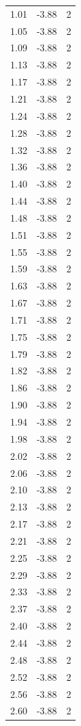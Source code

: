 \begin{longtable}{lrr}
  1.01 & -3.88 & 2 \\
  1.05 & -3.88 & 2 \\
  1.09 & -3.88 & 2 \\
  1.13 & -3.88 & 2 \\
  1.17 & -3.88 & 2 \\
  1.21 & -3.88 & 2 \\
  1.24 & -3.88 & 2 \\
  1.28 & -3.88 & 2 \\
  1.32 & -3.88 & 2 \\
  1.36 & -3.88 & 2 \\
  1.40 & -3.88 & 2 \\
  1.44 & -3.88 & 2 \\
  1.48 & -3.88 & 2 \\
  1.51 & -3.88 & 2 \\
  1.55 & -3.88 & 2 \\
  1.59 & -3.88 & 2 \\
  1.63 & -3.88 & 2 \\
  1.67 & -3.88 & 2 \\
  1.71 & -3.88 & 2 \\
  1.75 & -3.88 & 2 \\
  1.79 & -3.88 & 2 \\
  1.82 & -3.88 & 2 \\
  1.86 & -3.88 & 2 \\
  1.90 & -3.88 & 2 \\
  1.94 & -3.88 & 2 \\
  1.98 & -3.88 & 2 \\
  2.02 & -3.88 & 2 \\
  2.06 & -3.88 & 2 \\
  2.10 & -3.88 & 2 \\
  2.13 & -3.88 & 2 \\
  2.17 & -3.88 & 2 \\
  2.21 & -3.88 & 2 \\
  2.25 & -3.88 & 2 \\
  2.29 & -3.88 & 2 \\
  2.33 & -3.88 & 2 \\
  2.37 & -3.88 & 2 \\
  2.40 & -3.88 & 2 \\
  2.44 & -3.88 & 2 \\
  2.48 & -3.88 & 2 \\
  2.52 & -3.88 & 2 \\
  2.56 & -3.88 & 2 \\
  2.60 & -3.88 & 2 \\

\end{longtable}
